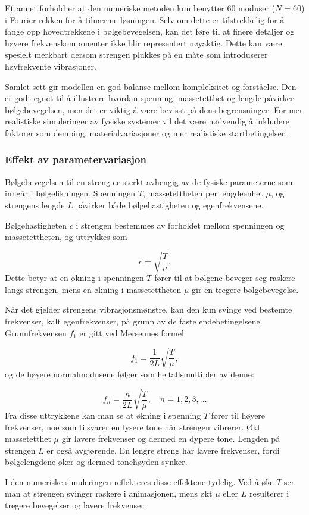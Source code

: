 Et annet forhold er at den numeriske metoden kun benytter 60 moduser ($N=60$) i Fourier-rekken for å tilnærme 
løsningen. Selv om dette er tilstrekkelig for å fange opp hovedtrekkene i bølgebevegelsen, kan det 
føre til at finere detaljer og høyere frekvenskomponenter ikke blir representert nøyaktig. Dette kan være spesielt merkbart
dersom strengen plukkes på en måte som introduserer høyfrekvente vibrasjoner.

Samlet sett gir modellen en god balanse mellom kompleksitet og forståelse. Den er godt egnet til å illustrere
hvordan spenning, massetetthet og lengde påvirker bølgebevegelsen, men det er viktig å være bevisst på dens
begrensninger. For mer realistiske simuleringer av fysiske systemer vil det være nødvendig å inkludere faktorer
som demping, materialvariasjoner og mer realistiske startbetingelser.

\subsubsection{Effekt av parametervariasjon}

Bølgebevegelsen til en streng er sterkt avhengig av de fysiske parameterne som inngår i bølgelikningen. Spenningen \( T \), massetettheten per lengdeenhet \( \mu \), og strengens lengde \( L \) påvirker både bølgehastigheten og egenfrekvensene.

Bølgehastigheten \( c \) i strengen bestemmes av forholdet mellom spenningen og massetettheten, og uttrykkes som

\begin{equation*}
c = \sqrt{\frac{T}{\mu}}.
\end{equation*}
Dette betyr at en økning i spenningen \( T \) fører til at bølgene beveger seg raskere langs strengen, mens en økning i massetettheten \( \mu \) gir en tregere bølgebevegelse. 

Når det gjelder strengens vibrasjonsmønstre, kan den kun svinge ved bestemte frekvenser, kalt egenfrekvenser, på grunn av de faste endebetingelsene. Grunnfrekvensen \( f_1 \) er gitt ved Mersennes formel

\begin{equation*}
f_1 = \frac{1}{2L} \sqrt{\frac{T}{\mu}},
\end{equation*}
og de høyere normalmodusene følger som heltallsmultipler av denne:

\begin{equation*}
f_n = \frac{n}{2L} \sqrt{\frac{T}{\mu}}, \quad n=1,2,3,\ldots
\end{equation*}
\clearpage
Fra disse uttrykkene kan man se at økning i spenning \( T \) fører til høyere frekvenser, noe som tilsvarer en lysere tone når strengen vibrerer. Økt massetetthet \( \mu \) gir lavere frekvenser og dermed en dypere tone. Lengden på strengen \( L \) er også avgjørende. En lengre streng har lavere frekvenser, fordi bølgelengdene øker og dermed tonehøyden synker.

I den numeriske simuleringen reflekteres disse effektene tydelig. Ved å øke \( T \) ser man at strengen svinger raskere i animasjonen, mens økt \( \mu \) eller \( L \) resulterer i tregere bevegelser og lavere frekvenser.